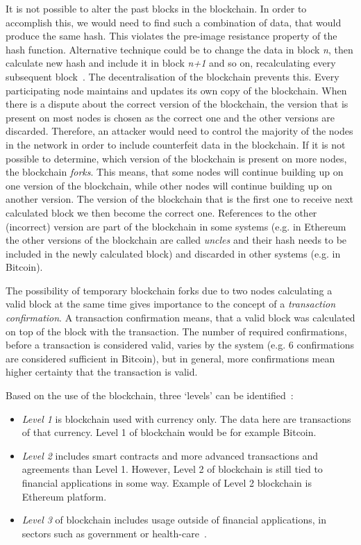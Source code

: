 It is not possible to alter the past blocks in the blockchain. In order to accomplish this, we would need to find such a combination of data, that would produce the same hash. This violates the pre-image resistance property of the hash function. Alternative technique could be to change the data in block \textit{n}, then calculate new hash and include it in block \textit{n+1} and so on, recalculating every subsequent block~\cite[3]{NakamotoBitcoin:System}. The decentralisation of the blockchain prevents this. Every participating node maintains and updates its own copy of the blockchain. When there is a dispute about the correct version of the blockchain, the version that is present on most nodes is chosen as the correct one and the other versions are discarded. Therefore, an attacker would need to control the majority of the nodes in the network in order to include counterfeit data in the blockchain. If it is not possible to determine, which version of the blockchain is present on more nodes, the blockchain \textit{forks}. This means, that some nodes will continue building up on one version of the blockchain, while other nodes will continue building up on another version. The version of the blockchain that is the first one to receive next calculated block we then become the correct one. References to the other (incorrect) version are part of the blockchain in some systems (e.g. in Ethereum the other versions of the blockchain are called \textit{uncles} and their hash needs to be included in the newly calculated block) and discarded in other systems (e.g. in Bitcoin).

The possibility of temporary blockchain forks due to two nodes calculating a valid block at the same time gives importance to the concept of a \textit{transaction confirmation}. A transaction confirmation means, that a valid block was calculated on top of the block with the transaction. The number of required confirmations, before a transaction is considered valid, varies by the system (e.g. 6 confirmations are considered sufficient in Bitcoin), but in general, more confirmations mean higher certainty that the transaction is valid\footnotemark.
% 

Based on the use of the blockchain, three `levels' can be identified~\cite{Swan2015BlockchainEconomy}:
\begin{itemize}[noitemsep, nolistsep]
    \item \textit{Level 1} is blockchain used with currency only. The data here are transactions of that currency. Level 1 of blockchain would be for example Bitcoin.
    \item \textit{Level 2} includes smart contracts and more advanced transactions and agreements than Level 1. However, Level 2 of blockchain is still tied to financial applications in some way. Example of Level 2 blockchain is Ethereum platform.
    \item \textit{Level 3} of blockchain includes usage outside of financial applications, in sectors such as government or health-care~\cite{Swan2015BlockchainEconomy}.
\end{itemize}

